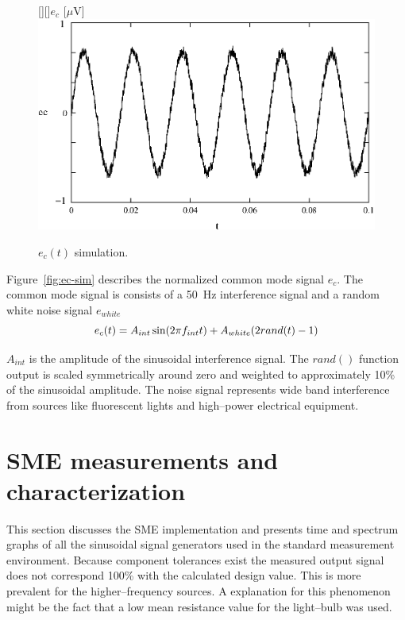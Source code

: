 \begin{figure}[htbp]
\begin{center}
	[][]{$e_c$ [$\mu$V]}
	\includegraphics[width=\textwidth]{ec-sim.eps}
    \caption{$e_c(t)$ simulation.}
    \label{fig:ec-sim}
\end{center}
\end{figure}

Figure~\vref{fig:ec-sim} describes the normalized common mode signal
$e_c$. The common mode signal is consists of a 50~Hz interference
signal and a random white noise signal $e_{white}$
\begin{equation} \label{eq:ec-sim}
	e_c(t) = A_{int}\sin\/(2\pi\/f_{int}\/t) + A_{white}(2rand(t)-1) 
\end{equation}

$A_{int}$ is the amplitude of the sinusoidal interference signal. The
$rand()$ function output is scaled symmetrically around zero and
weighted to approximately 10\% of the sinusoidal amplitude. The noise
signal represents wide band interference from sources like fluorescent
lights and high--power electrical equipment.


\section{SME measurements and characterization}

This section discusses the SME implementation and presents time and
spectrum graphs of all the sinusoidal signal generators used in the
standard measurement environment. Because component tolerances exist
the measured output signal does not correspond 100\% with the
calculated design value. This is more prevalent for the
higher--frequency sources. A explanation for this phenomenon might be
the fact that a low mean resistance value for the light--bulb was
used.

